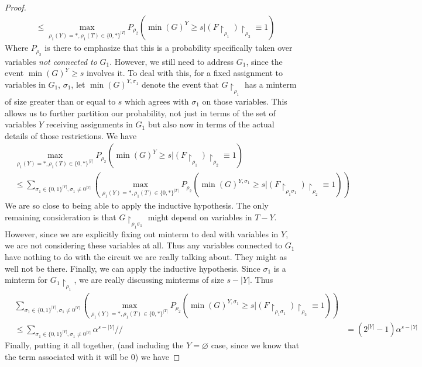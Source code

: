 \begin{proof}
\begin{align*}
	 &\leq \max_{\rho_1(Y) = *, \rho_1(T) \in \{0,*\}^{|T|}} P_{\rho_2}(\min(G)^Y \geq s| (F \restriction_{\rho_1}) \restriction_{\rho_2} \equiv 1) 
\end{align*} 
Where $P_{\rho_2}$ is there to emphasize that this is a probability specifically taken over variables \emph{not connected to } $G_1$. However, we still need to address $G_1$, since the event $\min(G)^Y \geq s$ involves it. To deal with this, for a fixed assignment to variables in $G_1$, $\sigma_1$, let $\min(G)^{Y,\sigma_1}$ denote the event that $G \restriction_{\rho_1}$ has a minterm of size greater than or equal to $s$ which agrees with $\sigma_1$ on those variables. This allows us to further partition our probability, not just in terms of the set of variables $Y$ receiving assignments in $G_1$ but also now in terms of the actual details of those restrictions. We have
\begin{align*}
	& \max_{\rho_1(Y) = *, \rho_1(T) \in \{0,*\}^{|T|}} P_{\rho_2}(\min(G)^Y \geq s| (F \restriction_{\rho_1}) \restriction_{\rho_2} \equiv 1) \\
	&\leq \sum_{\sigma_1 \in \{0,1\}^{|Y|},\sigma_1 \neq 0^{|Y|}} \left( \max_{\rho_1(Y) = *, \rho_1(T) \in \{0,*\}^{|T|}} P_{\rho_2}(\min(G)^{Y,\sigma_1} \geq s| (F \restriction_{\rho_1 \sigma_1}) \restriction_{\rho_2} \equiv 1) \right)
\end{align*}
We are so close to being able to apply the inductive hypothesis. The only remaining consideration is that $G \restriction_{\rho_1 \sigma_1}$ might depend on variables in $T-Y$. However, since we are explicitly fixing out minterm to deal with variables in $Y$, we are not considering these variables at all. Thus any variables connected to $G_1$ have nothing to do with the circuit we are really talking about. They might as well not be there. Finally, we can apply the inductive hypothesis. Since $\sigma_1$ is a minterm for $G_1 \restriction_{\rho_1}$, we are really discussing minterms of size $s-|Y|$. Thus 
\begin{align*}
	& \sum_{\sigma_1 \in \{0,1\}^{|Y|},\sigma_1 \neq 0^{|Y|}} \left( \max_{\rho_1(Y) = *, \rho_1(T) \in \{0,*\}^{|T|}} P_{\rho_2}(\min(G)^{Y,\sigma_1} \geq s| (F \restriction_{\rho_1 \sigma_1}) \restriction_{\rho_2} \equiv 1) \right) \\
	&\leq \sum_{\sigma_1 \in \{0,1\}^{|Y|},\sigma_1 \neq 0^{|Y|}} \alpha^{s-|Y|} //
	&= (2^{|Y|}-1)\alpha^{s-|Y|}
\end{align*}
Finally, putting it all together, (and including the $Y=\varnothing$ case, since we know that the term associated with it will be $0$) we have

\end{proof}
